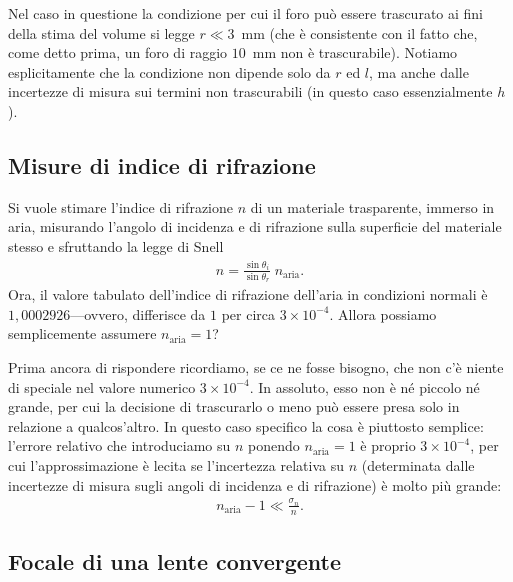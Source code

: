 \begin{examplebox}
  \begin{example}
    Nel caso in questione la condizione per cui il foro può essere trascurato
    ai fini della stima del volume si legge $r \ll 3$~mm (che è consistente
    con il fatto che, come detto prima, un foro di raggio $10$~mm non è
    trascurabile). Notiamo esplicitamente che la condizione non dipende solo da
    $r$ ed $l$, ma anche dalle incertezze di misura sui termini non
    trascurabili (in questo caso essenzialmente $h$).
  \end{example}
\end{examplebox}


\subsection{Misure di indice di rifrazione}

Si vuole stimare l'indice di rifrazione $n$ di un materiale trasparente,
immerso in aria, misurando l'angolo di incidenza e di rifrazione sulla
superficie del materiale stesso e sfruttando la legge di Snell
\begin{align*}
  n = \frac{\sin\theta_i}{\sin\theta_r} \; n_\text{aria}.
\end{align*}
Ora, il valore tabulato dell'indice di rifrazione dell'aria in condizioni
normali è $1,0002926$---ovvero, differisce da $1$ per circa $3 \times 10^{-4}$.
Allora possiamo semplicemente assumere $n_\text{aria} = 1$?

Prima ancora di rispondere ricordiamo, se ce ne fosse bisogno, che non c'è
niente di speciale nel valore numerico $3 \times 10^{-4}$. In assoluto, esso non
è né piccolo né grande, per cui la decisione di trascurarlo o meno può
essere presa solo in relazione a qualcos'altro.
In questo caso specifico la cosa è piuttosto semplice: l'errore relativo che
introduciamo su $n$ ponendo $n_\text{aria} = 1$ è proprio $3 \times 10^{-4}$,
per cui l'approssimazione è lecita se l'incertezza relativa su $n$
(determinata dalle incertezze di misura sugli angoli di incidenza e di
rifrazione) è molto più grande:
\begin{align*}
  n_\text{aria} - 1 \ll \frac{\sigma_n}{n}.
\end{align*}


\subsection{Focale di una lente convergente}

